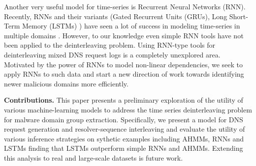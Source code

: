 	Another very useful model for time-series is Recurrent Neural Networks
	(RNN).  Recently, RNNs and their variants (Gated Recurrent Units
	(GRUs)\cite{chung2014empirical}, Long Short-Term Memory
	(LSTMs) \cite{Hochreiter}) have seen a lot of success in modeling
	time-series in multiple domains \cite{bahdanau2014neural,
		NIPS2008_3449, sutskever2014sequence}.  However, to our knowledge even
	simple RNN tools have not been applied to the deinterleaving
	problem. Using RNN-type tools for deinterleaving mixed DNS request
	logs is a completely unexplored area.  Motivated by the power of RNNs
	to model non-linear dependencies, we seek to apply RNNs to such data
	and start a new direction of work towards identifying newer malicious
	domains more efficiently.
	
	{\bf Contributions. } This paper presents a preliminary exploration of
	the utility of various machine-learning models to address the time
	series deinterleaving problem for malware domain group extraction.
	Specifically, we present a model for DNS request generation and
	resolver-sequence interleaving and evaluate the utility of various
	inference strategies on sythetic examples including AHMMs, RNNs and
	LSTMs finding that LSTMs outperform simple RNNs and AHMMs.  Extending
	this analysis to real and large-scale datasets is future work. 
